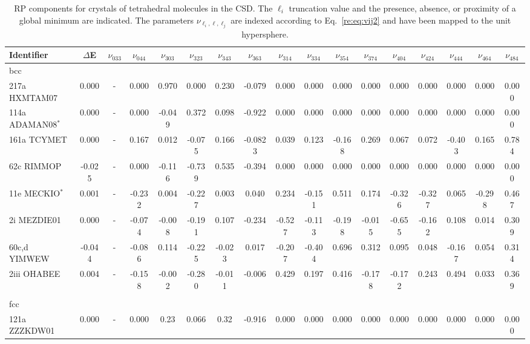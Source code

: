 \documentclass[preprint]{iucr}              %
\begin{document}
\begin{landscape}
\begin{table}
\caption{RP components for crystals of tetrahedral molecules in the
CSD.  The $\ell_i$ truncation value and the presence, absence, or
proximity of a global minimum are indicated. The parameters
$\nu_{\ell_i,\ell,\ell_j}$ are indexed according to
Eq.~\ref{re:eq:vij2} and have been mapped to the unit hypersphere.}
\label{RPTop} \tiny
\begin{tabular}{lcccccccccccccccc}\hline
Identifier & $\Delta$E & $\nu_{033}$ & $\nu_{044}$ & $\nu_{303}$ &
$\nu_{323}$ & $\nu_{343}$ & $\nu_{363}$ & $\nu_{314}$ & $\nu_{334}$
& $\nu_{354}$ & $\nu_{374}$ & $\nu_{404}$ & $\nu_{424}$ &
$\nu_{444}$ & $\nu_{464}$ & $\nu_{484}$ \\
\hline
bcc\\
217a HXMTAM07 & 0.000 & - & 0.000 & 0.970 & 0.000 & 0.230 & -0.079 & 0.000 & 0.000 & 0.000 & 0.000 & 0.000 & 0.000 & 0.000 & 0.000 & 0.000 \\
114a ADAMAN08$^*$ & 0.000 & - & 0.000 & -0.049 & 0.372 & 0.098 & -0.922 & 0.000 & 0.000 & 0.000 & 0.000 & 0.000 & 0.000 & 0.000 & 0.000 & 0.000 \\
161a TCYMET & 0.000 & - & 0.167 & 0.012 & -0.075 & 0.166 & -0.0823 & 0.039 & 0.123 & -0.168 & 0.269 & 0.067 & 0.072 & -0.403 & 0.165 & 0.784 \\
62c RIMMOP & -0.025 & - & 0.000 & -0.116 & -0.739 & 0.535 & -0.394 & 0.000 & 0.000 & 0.000 & 0.000 & 0.000 & 0.000 & 0.000 & 0.000 & 0.000 \\
11e MECKIO$^*$ & 0.001 & - & -0.232 & 0.004 & -0.227 & 0.003 & 0.040 & 0.234 & -0.151 & 0.511 & 0.174 & -0.326 & -0.327 & 0.065 & -0.298 & 0.467 \\
2i MEZDIE01 & 0.000 & - & -0.074 & -0.008 & -0.191 & 0.107 & -0.234 & -0.527 & -0.113 & -0.198 & -0.015 & -0.655 & -0.162 & 0.108 & 0.014 & 0.309 \\
60c,d YIMWEW & -0.044 & - & -0.086 & 0.114 & -0.225 & -0.023 & 0.017 & -0.207 & -0.404 & 0.696 & 0.312 & 0.095 & 0.048 & -0.167 & 0.054 & 0.314 \\
2iii OHABEE & 0.004 & - & -0.158 & -0.002 & -0.280 & -0.011 & -0.006 & 0.429 & 0.197 & 0.416 & -0.178 & -0.172 & 0.243 & 0.494 & 0.033 & 0.369 \\
\\
fcc\\
121a ZZZKDW01 & 0.000 & - & 0.000 & 0.23 & 0.066 & 0.32 & -0.916 & 0.000 & 0.000 & 0.000 & 0.000 & 0.000 & 0.000 & 0.000 & 0.000 & 0.000 \\

\end{tabular}
\end{table}
\end{landscape}
\end{document}
